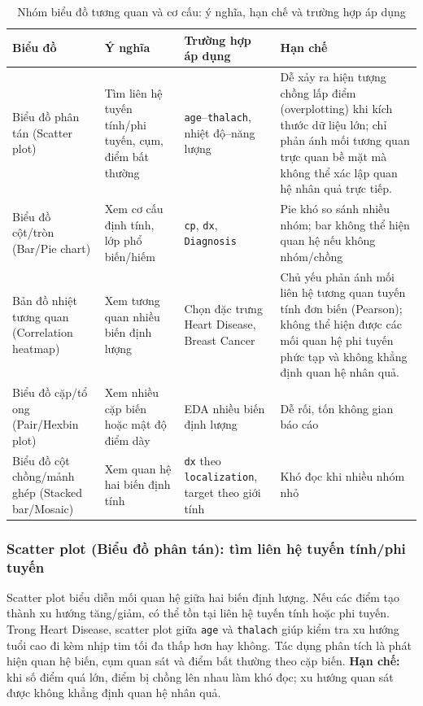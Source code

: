\begin{table}[H]
\centering
\caption{Nhóm biểu đồ tương quan và cơ cấu: ý nghĩa, hạn chế và trường hợp áp dụng}
\label{tab:chapter1_relation_structure_chart_group}
\small
\begin{tabular}{p{}p{}p{}p{}}
\toprule
Biểu đồ & Ý nghĩa & Trường hợp áp dụng & Hạn chế \\
\midrule
Biểu đồ phân tán (Scatter plot) & Tìm liên hệ tuyến tính/phi tuyến, cụm, điểm bất thường & \texttt{age}--\texttt{thalach}, nhiệt độ--năng lượng & Dễ xảy ra hiện tượng chồng lấp điểm (overplotting) khi kích thước dữ liệu lớn; chỉ phản ánh mối tương quan trực quan bề mặt mà không thể xác lập quan hệ nhân quả trực tiếp. \\
Biểu đồ cột/tròn (Bar/Pie chart) & Xem cơ cấu định tính, lớp phổ biến/hiếm & \texttt{cp}, \texttt{dx}, \texttt{Diagnosis} & Pie khó so sánh nhiều nhóm; bar không thể hiện quan hệ nếu không nhóm/chồng \\
Bản đồ nhiệt tương quan (Correlation heatmap) & Xem tương quan nhiều biến định lượng & Chọn đặc trưng Heart Disease, Breast Cancer & Chủ yếu phản ánh mối liên hệ tương quan tuyến tính đơn biến (Pearson); không thể hiện được các mối quan hệ phi tuyến phức tạp và không khẳng định quan hệ nhân quả. \\
Biểu đồ cặp/tổ ong (Pair/Hexbin plot) & Xem nhiều cặp biến hoặc mật độ điểm dày & EDA nhiều biến định lượng & Dễ rối, tốn không gian báo cáo \\
Biểu đồ cột chồng/mảnh ghép (Stacked bar/Mosaic) & Xem quan hệ hai biến định tính & \texttt{dx} theo \texttt{localization}, target theo giới tính & Khó đọc khi nhiều nhóm nhỏ \\
\bottomrule
\end{tabular}
\end{table}

\subsubsection{Scatter plot (Biểu đồ phân tán): tìm liên hệ tuyến tính/phi tuyến}

Scatter plot biểu diễn mối quan hệ giữa hai biến định lượng. Nếu các điểm tạo thành xu hướng tăng/giảm, có thể tồn tại liên hệ tuyến tính hoặc phi tuyến. Trong Heart Disease, scatter plot giữa \texttt{age} và \texttt{thalach} giúp kiểm tra xu hướng tuổi cao đi kèm nhịp tim tối đa thấp hơn hay không. Tác dụng phân tích là phát hiện quan hệ biến, cụm quan sát và điểm bất thường theo cặp biến. \textbf{Hạn chế:} khi số điểm quá lớn, điểm bị chồng lên nhau làm khó đọc; xu hướng quan sát được không khẳng định quan hệ nhân quả.

